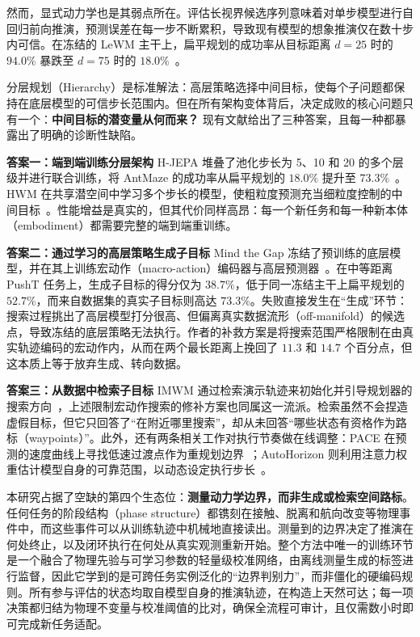 \documentclass[11pt]{article}
\begin{document}
然而，显式动力学也是其弱点所在。评估长视界候选序列意味着对单步模型进行自回归前向推演，预测误差在每一步不断累积，导致现有模型的想象推演仅在数十步内可信。在冻结的 LeWM 主干上，扁平规划的成功率从目标距离 $d=25$ 时的 $94.0\%$ 暴跌至 $d=75$ 时的 $18.0\%$~\cite{mindthegap2026}。

分层规划（Hierarchy）是标准解法：高层策略选择中间目标，使每个子问题都保持在底层模型的可信步长范围内。但在所有架构变体背后，决定成败的核心问题只有一个：\textbf{中间目标的潜变量从何而来？} 现有文献给出了三种答案，且每一种都暴露出了明确的诊断性缺陷。

\textbf{答案一：端到端训练分层架构} H-JEPA 堆叠了池化步长为 5、10 和 20 的多个层级并进行联合训练，将 AntMaze 的成功率从扁平规划的 $18.0\%$ 提升至 $73.3\%$~\cite{hjepa2026}。HWM 在共享潜空间中学习多个步长的模型，使粗粒度预测充当细粒度控制的中间目标~\cite{hwm2026}。性能增益是真实的，但其代价同样高昂：每一个新任务和每一种新本体（embodiment）都需要完整的端到端重训练。

\textbf{答案二：通过学习的高层策略生成子目标} Mind the Gap 冻结了预训练的底层模型，并在其上训练宏动作（macro-action）编码器与高层预测器~\cite{mindthegap2026}。在中等距离 PushT 任务上，生成子目标的得分仅为 $38.7\%$，低于同一冻结主干上扁平规划的 $52.7\%$，而来自数据集的真实子目标则高达 $73.3\%$。失败直接发生在“生成”环节：搜索过程挑出了高层模型打分很高、但偏离真实数据流形（off-manifold）的候选点，导致冻结的底层策略无法执行。作者的补救方案是将搜索范围严格限制在由真实轨迹编码的宏动作内，从而在两个最长距离上挽回了 $11.3$ 和 $14.7$ 个百分点，但这本质上等于放弃生成、转向数据。

\textbf{答案三：从数据中检索子目标} IMWM 通过检索演示轨迹来初始化并引导规划器的搜索方向~\cite{imwm2026}，上述限制宏动作搜索的修补方案也同属这一流派。检索虽然不会捏造虚假目标，但它只回答了“在附近哪里搜索”，却从未回答“哪些状态有资格作为路标（waypoints）”。此外，还有两条相关工作对执行节奏做在线调整：PACE 在预测的速度曲线上寻找低速过渡点作为重规划边界~\cite{pace2026}；AutoHorizon 则利用注意力权重估计模型自身的可靠范围，以动态设定执行步长~\cite{autohorizon2026}。

本研究占据了空缺的第四个生态位：\textbf{测量动力学边界，而非生成或检索空间路标}。任何任务的阶段结构（phase structure）都镌刻在接触、脱离和航向改变等物理事件中，而这些事件可以从训练轨迹中机械地直接读出。测量到的边界决定了推演在何处终止，以及闭环执行在何处从真实观测重新开始。整个方法中唯一的训练环节是一个融合了物理先验与可学习参数的轻量级校准网络，由离线测量生成的标签进行监督，因此它学到的是可跨任务实例泛化的“边界判别力”，而非僵化的硬编码规则。所有参与评估的状态均取自模型自身的推演轨迹，在构造上天然可达；每一项决策都归结为物理不变量与校准阈值的比对，确保全流程可审计，且仅需数小时即可完成新任务适配。
\end{document}
